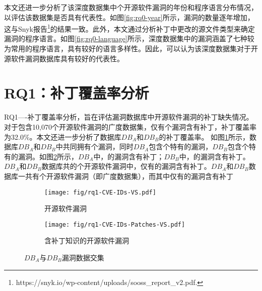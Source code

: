     

本文还进一步分析了该深度数据集中个开源软件漏洞的年份和程序语言分布情况，以评估该数据集是否具有代表性。如图\ref{fig:rq0-year}所示，漏洞的数量逐年增加，这与Snyk报告\footnote{https://snyk.io/wp-content/uploads/sooss\_report\_v2.pdf.}的结果一致。此外，本文通过分析补丁中更改的源文件类型来确定漏洞的程序语言。如图\ref{fig:rq0-language}所示，深度数据集中的漏洞涵盖了七种较为常用的程序语言，具有较好的语言多样性。因此，可以认为该深度数据集对于开源软件漏洞数据库具有较好的代表性。


\section{RQ1：补丁覆盖率分析}\label{sec:coverage}
RQ1----补丁覆盖率分析，旨在评估漏洞数据库中开源软件漏洞的补丁缺失情况。对于包含10,070个开源软件漏洞的广度数据集，仅有个漏洞含有补丁，补丁覆盖率为32.0\%。本文还进一步分析了数据库$DB_A$和$DB_B$的补丁覆盖率。
如图\ref{fig:rq1-cves}所示，数据库$DB_A$和$DB_B$中共同拥有个漏洞，同时$DB_A$包含个特有的漏洞，$DB_B$包含个特有的漏洞。如图\ref{fig:rq1-cves-with-patches}所示，$DB_A$中，的漏洞含有补丁；$DB_B$中，的漏洞含有补丁。$DB_A$和$DB_B$数据库共的个开源软件漏洞中，仅有的漏洞含有补丁。$DB_A$和$DB_B$数据库一共有个开源软件漏洞（即广度数据集），而其中仅有的漏洞含有补丁
\begin{figure}[!t]
    \centering
    \begin{subfigure}[b]{0.45\textwidth}
    \centering
    \texttt{[image: fig/rq1-CVE-IDs-VS.pdf]}
    \caption{开源软件漏洞}\label{fig:rq1-cves}
    \end{subfigure}
    \begin{subfigure}[b]{0.45\textwidth}
    \centering
    \texttt{[image: fig/rq1-CVE-IDs-Patches-VS.pdf]}
    \caption{含补丁知识的开源软件漏洞}\label{fig:rq1-cves-with-patches}
    \end{subfigure}
    \caption{$DB_A$与$DB_B$漏洞数据交集}\label{fig:intersection}
\end{figure}


